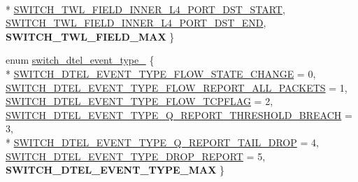 \begin{DoxyCompactItemize}
\\*
\hyperlink{group__DTel_ggac1ac564283da72d8f9315c73246d73a7a16af72bbbe0773d7a87f1c0a1919b576}{S\+W\+I\+T\+C\+H\+\_\+\+T\+W\+L\+\_\+\+F\+I\+E\+L\+D\+\_\+\+I\+N\+N\+E\+R\+\_\+\+L4\+\_\+\+P\+O\+R\+T\+\_\+\+D\+S\+T\+\_\+\+S\+T\+A\+R\+T}, 
\hyperlink{group__DTel_ggac1ac564283da72d8f9315c73246d73a7a748a2b18c4ca2a26b4f7a1bea0f67212}{S\+W\+I\+T\+C\+H\+\_\+\+T\+W\+L\+\_\+\+F\+I\+E\+L\+D\+\_\+\+I\+N\+N\+E\+R\+\_\+\+L4\+\_\+\+P\+O\+R\+T\+\_\+\+D\+S\+T\+\_\+\+E\+N\+D}, 
{\bfseries S\+W\+I\+T\+C\+H\+\_\+\+T\+W\+L\+\_\+\+F\+I\+E\+L\+D\+\_\+\+M\+A\+X}
 \}
\item 
enum \hyperlink{group__DTel_gad4cfb745b37be86549050bcd8c3166c0}{switch\+\_\+dtel\+\_\+event\+\_\+type\+\_\+} \{ \\*
\hyperlink{group__DTel_ggad4cfb745b37be86549050bcd8c3166c0a509e6be9e2e1e20c1b9ae6a1fbfa0fba}{S\+W\+I\+T\+C\+H\+\_\+\+D\+T\+E\+L\+\_\+\+E\+V\+E\+N\+T\+\_\+\+T\+Y\+P\+E\+\_\+\+F\+L\+O\+W\+\_\+\+S\+T\+A\+T\+E\+\_\+\+C\+H\+A\+N\+G\+E} = 0, 
\hyperlink{group__DTel_ggad4cfb745b37be86549050bcd8c3166c0a37f45d54613eaa449571741c4b35beed}{S\+W\+I\+T\+C\+H\+\_\+\+D\+T\+E\+L\+\_\+\+E\+V\+E\+N\+T\+\_\+\+T\+Y\+P\+E\+\_\+\+F\+L\+O\+W\+\_\+\+R\+E\+P\+O\+R\+T\+\_\+\+A\+L\+L\+\_\+\+P\+A\+C\+K\+E\+T\+S} = 1, 
\hyperlink{group__DTel_ggad4cfb745b37be86549050bcd8c3166c0afa8d1ab7a59d4847cd114c1772868b95}{S\+W\+I\+T\+C\+H\+\_\+\+D\+T\+E\+L\+\_\+\+E\+V\+E\+N\+T\+\_\+\+T\+Y\+P\+E\+\_\+\+F\+L\+O\+W\+\_\+\+T\+C\+P\+F\+L\+A\+G} = 2, 
\hyperlink{group__DTel_ggad4cfb745b37be86549050bcd8c3166c0aec90ab109fc04ebf0744ab830f08ea91}{S\+W\+I\+T\+C\+H\+\_\+\+D\+T\+E\+L\+\_\+\+E\+V\+E\+N\+T\+\_\+\+T\+Y\+P\+E\+\_\+\+Q\+\_\+\+R\+E\+P\+O\+R\+T\+\_\+\+T\+H\+R\+E\+S\+H\+O\+L\+D\+\_\+\+B\+R\+E\+A\+C\+H} = 3, 
\\*
\hyperlink{group__DTel_ggad4cfb745b37be86549050bcd8c3166c0a925b3d754028ed35efaef875296167b1}{S\+W\+I\+T\+C\+H\+\_\+\+D\+T\+E\+L\+\_\+\+E\+V\+E\+N\+T\+\_\+\+T\+Y\+P\+E\+\_\+\+Q\+\_\+\+R\+E\+P\+O\+R\+T\+\_\+\+T\+A\+I\+L\+\_\+\+D\+R\+O\+P} = 4, 
\hyperlink{group__DTel_ggad4cfb745b37be86549050bcd8c3166c0ad256ebc5cd56e6009f7751c011349e6a}{S\+W\+I\+T\+C\+H\+\_\+\+D\+T\+E\+L\+\_\+\+E\+V\+E\+N\+T\+\_\+\+T\+Y\+P\+E\+\_\+\+D\+R\+O\+P\+\_\+\+R\+E\+P\+O\+R\+T} = 5, 
{\bfseries S\+W\+I\+T\+C\+H\+\_\+\+D\+T\+E\+L\+\_\+\+E\+V\+E\+N\+T\+\_\+\+T\+Y\+P\+E\+\_\+\+M\+A\+X}
 \}
\end{DoxyCompactItemize}
